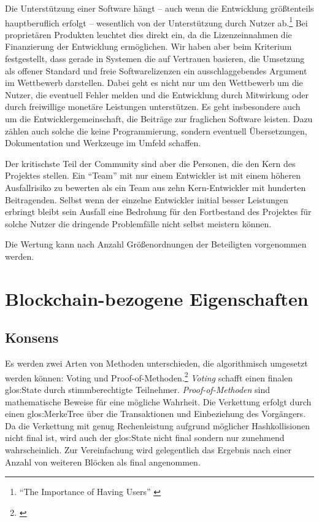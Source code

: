 Die Unterstützung einer Software hängt -- auch wenn die Entwicklung größtenteils hauptberuflich erfolgt -- wesentlich von der Unterstützung durch Nutzer ab.\footnote{\enquote{The Importance of Having Users} \autocite{Raymond:CB}}
Bei proprietären Produkten leuchtet dies direkt ein, da die Lizenzeinnahmen die Finanzierung der Entwicklung ermöglichen.
Wir haben aber beim Kriterium  festgestellt, dass gerade in Systemen die auf Vertrauen basieren, die Umsetzung als offener Standard und freie Softwarelizenzen ein ausschlaggebendes Argument im Wettbewerb darstellen. 
Dabei geht es nicht nur um den Wettbewerb um die Nutzer, die eventuell Fehler melden und die Entwicklung durch Mitwirkung oder durch freiwillige monetäre Leistungen unterstützen. Es geht insbesondere auch um die Entwicklergemeinschaft, die Beiträge zur fraglichen Software leisten. Dazu zählen auch solche die keine Programmierung, sondern eventuell Übersetzungen, Dokumentation und Werkzeuge im Umfeld schaffen.

Der kritischste Teil der Community sind aber die Personen, die den Kern des Projektes stellen.
Ein \enquote{Team} mit nur einem Entwickler ist mit einem höheren Ausfallrisiko zu bewerten als ein Team aus zehn Kern-Entwickler mit hunderten Beitragenden. Selbst wenn der einzelne Entwickler initial besser Leistungen erbringt bleibt sein Ausfall eine Bedrohung für den Fortbestand des Projektes für solche Nutzer die dringende Problemfälle nicht selbst meistern können.

Die Wertung kann nach Anzahl Größenordnungen der Beteiligten vorgenommen werden.


\section{Blockchain-bezogene Eigenschaften}\label{krit:blockchainproperties}

\subsection{Konsens}\label{krit:consensus}

Es werden zwei Arten von Methoden unterschieden, die algorithmisch umgesetzt werden können: Voting und Proof-of-Methoden.\footnote{\cite{p:hyperledger:consensus}}
\emph{Voting} schafft einen finalen \gls{glos:State} durch stimmberechtigte Teilnehmer.
\emph{Proof-of-Methoden} sind mathematische Beweise für eine mögliche Wahrheit.
Die Verkettung erfolgt durch einen \gls{glos:MerkeTree} über die Transaktionen und Einbeziehung des Vorgängers.
Da die Verkettung mit genug Rechenleistung aufgrund möglicher Hashkollisionen nicht final ist, wird auch der \gls{glos:State} nicht final sondern nur zunehmend wahrscheinlich. Zur Vereinfachung wird gelegentlich das Ergebnis nach einer Anzahl von weiteren Blöcken als final angenommen.

